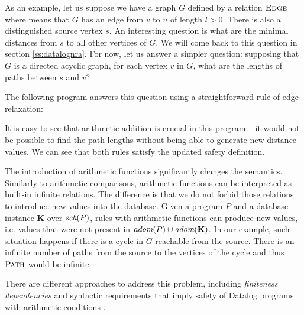 \begin{exmp}

As an example, let us suppose we have a graph $G$ defined by a relation $\textsc{Edge}$ 
where  means that $G$ has an edge from $v$ to $u$ of length $l > 0$. 
There is also a distinguished source vertex $s$.
An interesting question is what are the minimal distances from $s$ to all other vertices of $G$.
We will come back to this question in section \ref{ss:datalognra}.
For now, let us answer a simpler question: supposing that $G$ is a directed acyclic graph, for each vertex $v$ in $G$,
what are the lengths of paths between $s$ and $v$?

The following program answers this question using a straightforward rule of edge relaxation:


It is easy to see that arithmetic addition is crucial in this program -- it would not be possible to find the path lengths without being able to generate new distance values. We can see that both rules satisfy the updated safety definition.
\end{exmp}

The introduction of arithmetic functions significantly changes the semantics.
Similarly to arithmetic comparisons, arithmetic functions can be interpreted as built-in infinite relations. 
The difference is that we do not forbid those relations to introduce new values into the database.
Given a program $P$ and a database instance $\textbf{K}$ over $\textit{sch}(P)$, rules with arithmetic functions can produce new values, i.e. values that were not present in $\textit{adom}(P) \cup \textit{adom}(\textbf{K})$. In our example, such situation happens if there is a cycle in $G$ reachable from the source. There is an infinite number of paths from the source to the vertices of the cycle and thus $\textsc{Path}$ would be infinite.

There are different approaches to address this problem, including \emph{finiteness dependencies} and syntactic requirements that imply safety of Datalog programs with arithmetic conditions \cite{RBS87, KRS88a, KRS88b, SV89}.

